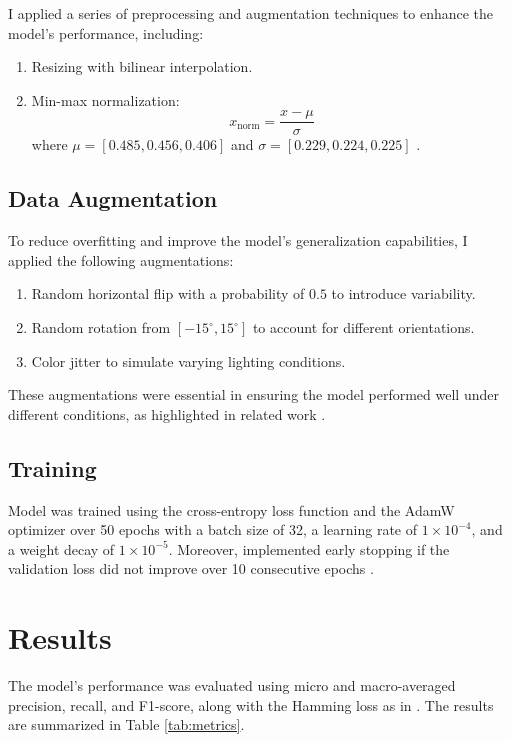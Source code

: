 \documentclass[conference]{IEEEtran}
\begin{document}
I applied a series of preprocessing and augmentation techniques to enhance the model's performance, including:

\begin{enumerate}
    \item Resizing with bilinear interpolation.
    \item Min-max normalization:
    \begin{equation}
        x_{\text{norm}} = \frac{x - \mu}{\sigma}
    \end{equation}
    where $\mu = [0.485, 0.456, 0.406]$ and $\sigma = [0.229, 0.224, 0.225]$ \cite{Dosovitskiy2020}.
\end{enumerate}

\subsection{Data Augmentation}
To reduce overfitting and improve the model's generalization capabilities, I applied the following augmentations:
\begin{enumerate}
    \item Random horizontal flip with a probability of $0.5$ to introduce variability.
    \item Random rotation from $[-15^\circ, 15^\circ]$ to account for different orientations.
    \item Color jitter to simulate varying lighting conditions.
\end{enumerate}
These augmentations were essential in ensuring the model performed well under different conditions, as highlighted in related work \cite{sebastian2024}.

\subsection{Training}
Model was trained using the cross-entropy loss function and the AdamW optimizer over 50 epochs with a batch size of 32, a learning rate of $1 \times 10^{-4}$, and a weight decay of $1 \times 10^{-5}$. Moreover, implemented early stopping if the validation loss did not improve over 10 consecutive epochs \cite{sebastian2024}.

\section{Results}

The model's performance was evaluated using micro and macro-averaged precision, recall, and F1-score, along with the Hamming loss as in \cite{sebastian2024}. The results are summarized in Table \ref{tab:metrics}.
\end{document}
